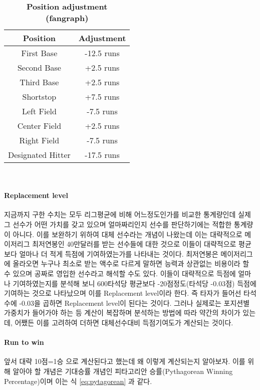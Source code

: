 \documentclass[11pt]{article}
\begin{document}
\begin{table}
\centering
\begin{tabular}{|c|c|}
\hline
Position & Adjustment   \\ \hline
First Base& -12.5 runs  \\
Second Base& +2.5 runs\\
Third Base& +2.5 runs\\
Shortstop& +7.5 runs\\
Left Field& -7.5 runs\\
Center Field& +2.5 runs\\
Right Field& -7.5 runs\\
Designated Hitter& -17.5 runs\\ \hline
\end{tabular}\\
\caption{\bf{Position adjustment (fangraph)}}
\label{tb6}
\end{table}

\paragraph{Replacement level}
지금까지 구한 수치는 모두 리그평균에 비해 어느정도인가를 비교한 통계량인데 실제 그 선수가 어떤 가치를 갖고 있으며 얼마짜리인지 선수를 판단하기에는 적합한 통계량이 아니다\cite{replace_graham}. 
이를 보완하기 위하여 대체 선수라는 개념이 나왔는데 이는 대략적으로 메이저리그 최저연봉인 40만달러를 받는 선수들에 대한 것으로 이들이 대략적으로 평균보다 얼마나 더 적게 득점에 기여하였는가를 나타내는 것이다. 최저연봉은 메이저리그에 올라오면 누구나 최소로 받는 액수로 다르게 말하면 능력과 상관없는 비용이라 할 수 있으며 공짜로 영입한 선수라고 해석할 수도 있다. 이들이 대략적으로 득점에 얼마나 기여하였는지를 분석해 보니 600타석당 평균보다 -20점정도(타석당 -0.03점) 득점에 기여하는 것으로 나타났으며 이를 Replacement level이라 한다. 즉 타자가 들어선 타석수에 -0.03을 곱하면 Replacement level이 된다는 것이다. 그러나 실제로는 포지션별 가중치가 들어가야 하는 등 계산이 복잡하며 분석하는 방법에 따라 약간의 차이가 있는데, 어쨌든 이를 고려하여 더하면 대체선수대비 득점기여도가 계산되는 것이다\cite{replace_dave,replace_dave2}. 

\paragraph{Run to win}
앞서 대략 10점=1승 으로 계산된다고 했는데 왜 이렇게 계산되는지 알아보자. 이를 위해 알아야 할 개념은 기대승률 개념인 피타고리안 승률(Pythagorean Winning Percentage)이며 이는 식 \ref{eq:pytagorean} 과 같다.
\end{document}
